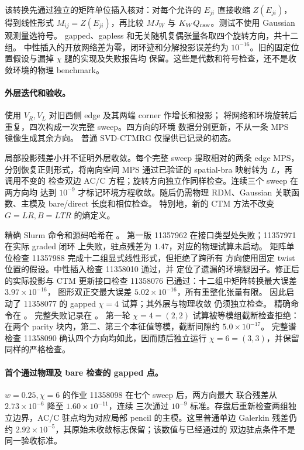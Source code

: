 该转换先通过独立的矩阵单位插入核对：对每个允许的 $E_{ji}$
直接收缩 $Z(E_{ji})$，得到线性形式 $M_{ij}=Z(E_{ji})$，再比较
$MJ_W$ 与 $K_WQ_{\rm raw}$。测试不使用 Gaussian 观测量选符号。
gapped、gapless 和无关随机复偶张量各取四个旋转方向，共十二组。
中性插入的开放网络差为零，闭环迹和分解投影误差约为
$10^{-16}$。旧的固定位置假设与漏掉 $\chi$ 腿的实现及失败报告均
保留。这些是代数和符号检查，还不是收敛环境的物理 benchmark。

\paragraph{外层迭代和验收。}
使用 $V_R,V_L$ 对旧西侧 edge 及其两端 corner 作增长和投影；
将网络和环境旋转后重复，四次构成一次完整 sweep。四方向的环境
数据分别更新，不从一条 MPS 镜像生成其余方向。
普通 SVD-CTMRG 仅提供已记录的初态。

局部投影残差小并不证明外层收敛。每个完整 sweep 提取相对的两条
edge MPS，分别恢复正则形式，将南向空间 MPS 通过已验证的
spatial-bra 映射转为 $L$，再调用不变的  检查双边
AC/C 方程；旋转方向独立作同样检查。连续三个 sweep 在两方向均
达到 $10^{-9}$ 才标记环境方程收敛。随后仍需物理 RDM、Gaussian
关联函数、主模及 bare/direct 长度和相位检查。
特别地，新的 CTM 方法不改变 $G=LR,B=LTR$ 的熵定义。

精确 Slurm 命令和源码哈希在
。
第一版 11357962 在接口类型处失败；11357971 在实际 graded 闭环
上失败，驻点残差为 $1.47$，对应的物理试算未启动。
矩阵单位检查 11357988 完成十二组显式线性形式，但拒绝了跨所有
方向使用固定 twist 位置的假设。中性插入检查 11358010 通过，并
定位了遗漏的环境腿因子。修正后的实际投影与 CTM 更新接口检查
11358076 已通过：十二组中矩阵转换最大误差 $3.97\times10^{-16}$，
图形双正交最大误差 $5.02\times10^{-16}$，所有重整化张量有限。
因此启动了 11358077 的 gapped $\chi=4$ 试算；其外层与物理收敛
仍须独立检查。
精确命令在 。
完整失败记录在 。
第一轮 $\chi=4=(2,2)$ 试算被等模组截断检查拒绝：在两个 parity
块内，第二、第三个本征值等模，截断间隙约 $5.0\times10^{-17}$。
完整谱检查 11358090 确认四个方向均如此，因而随后独立运行
$\chi=6=(3,3)$，并保留同样的严格检查。

\paragraph{首个通过物理及 bare 检查的 gapped 点。}
$w=0.25,\chi=6$ 的作业 11358098 在七个 sweep 后，两方向最大
联合残差从 $2.73\times10^{-6}$ 降至 $1.60\times10^{-11}$，连续
三次通过 $10^{-9}$ 标准。存盘后重新检查两组独立边界，AC/C
驻点均为对应局部 pencil 的主模。这里普通单边 Galerkin 残差仍约
$2.92\times10^{-5}$，其原始未收敛标志保留；该数值与已经通过的
双边驻点条件不是同一验收标准。

